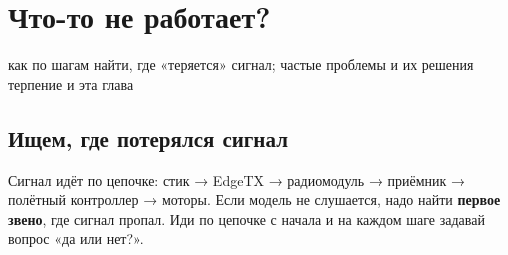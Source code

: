 \chapter{Что-то не работает?}
\label{ch:trouble}
\chapterintro
  {как по шагам найти, где «теряется» сигнал; частые проблемы и их решения}
  {терпение и эта глава}

\section{Ищем, где потерялся сигнал}

\begin{simple}
Сигнал идёт по цепочке: стик → EdgeTX → радиомодуль → приёмник → полётный контроллер → моторы.
Если модель не слушается, надо найти \textbf{первое звено}, где сигнал пропал. Иди по цепочке
с начала и на каждом шаге задавай вопрос «да или нет?».
\end{simple}

